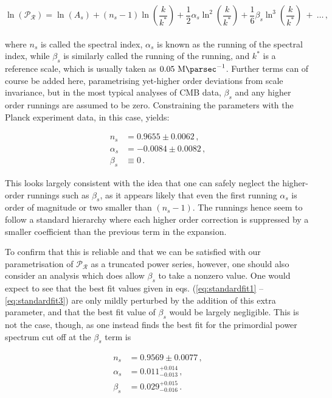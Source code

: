 \documentclass[universe,preprints,oneauthor,pdftex,10pt,a4paper]{mdpi}
\newcommand{\beq}{\begin{equation}}
\newcommand{\eeq}{\end{equation}\\}
\newcommand{\rpar}[1]{\left(#1\right)}
\begin{document}

\beq
\ln\rpar{\mathcal{P}_\mathcal{R}} = \ln \rpar{A_s} + (n_s - 1) \ln \rpar{\frac{k}{k^*}} + \frac{1}{2} \alpha_s \ln^2 \rpar{\frac{k}{k^*}} + \frac{1}{6} \beta_s \ln^3 \rpar{\frac{k}{k^*}} \ + \ \ldots \, , \label{eq:PSParam}
\eeq

where $n_s$ is called the spectral index, $\alpha_s$ is known as the running of the spectral index, while $\beta_s$ is similarly called the running of the running, and $k^*$ is a reference scale, which is usually taken as $0.05 \ \si{ \mega \parsec^{-1}}$. Further terms can of course be added here, parametrising yet-higher order deviations from scale invariance, but in the most typical analyses of CMB data, $\beta_s$ and any higher order runnings are assumed to be zero. Constraining the parameters with the Planck experiment data, in this case, yields:

\begin{align}
n_s & = 0.9655 \pm 0.0062 \, , \label{eq:standardfit1} \\ 
\alpha_s & = -0.0084 \pm 0.0082 \, , \\
\beta_s & \equiv 0  \, . \label{eq:standardfit3}
\end{align}

This looks largely consistent with the idea that one can safely neglect the higher-order runnings such as $\beta_s$, as it appears likely that even the first running $\alpha_s$ is order of magnitude or two smaller than $(n_s - 1)$. The runnings hence seem to follow a standard hierarchy where each higher order correction is suppressed by a smaller coefficient than the previous term in the expansion. 

To confirm that this is reliable and that we can be satisfied with our parametrisation of $\mathcal{P}_\mathcal{R}$ as a truncated power series, however, one should also consider an analysis which does allow $\beta_s$ to take a nonzero value. One would expect to see that the best fit values given in eqs. (\ref{eq:standardfit1} -- \ref{eq:standardfit3}) are only mildly perturbed by the addition of this extra parameter, and that the best fit value of $\beta_s$ would be largely negligible. This is not the case, though, as one instead finds the best fit for the primordial power spectrum cut off at the $\beta_s$ term is

\begin{align}
n_s & = 0.9569 \pm 0.0077 \, , \\ 
\alpha_s & = 0.011^{+0.014}_{-0.013} \, , \\
\beta_s & = 0.029^{+0.015}_{-0.016} \, .
\end{align}
\end{document}
